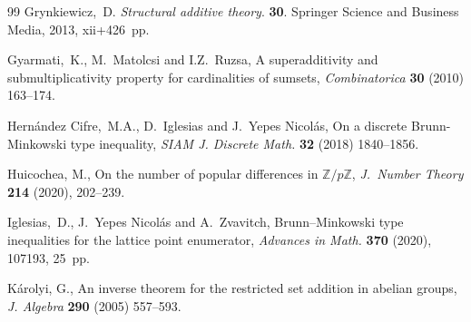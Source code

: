 \documentclass[12pt,reqno]{amsart}
\theoremstyle{definition}
\begin{document}
\begin{thebibliography}{99}
Grynkiewicz,~D. {\em Structural additive theory}. \textbf{30}. Springer Science and Business Media, 2013, xii+426~pp.



Gyarmati,~K., M.~Matolcsi and I.Z.~Ruzsa,  A superadditivity and submultiplicativity property for cardinalities of sumsets, {\em Combinatorica} {\bf 30} (2010) 163--174.





Hernández Cifre,~M.A., D.~Iglesias and J.~Yepes Nicolás,
On a discrete Brunn-Minkowski type inequality,
{\em SIAM J. Discrete Math.} {\bf 32} (2018) 1840--1856.

Huicochea, M., On the number of popular differences in ${\mathbb Z} / p {\mathbb Z}$,
{\em J.~Number Theory} {\bf 214} (2020), 202--239.

Iglesias,~D., J.~Yepes Nicol\'as and A.~Zvavitch,  Brunn--Minkowski type inequalities for the lattice point enumerator, {\em Advances in Math.} {\bf 370} (2020), 107193, 25~pp.

K\'arolyi, G.,
An inverse theorem for the restricted set addition in abelian groups,
{\em J. Algebra} {\bf 290} (2005) 557--593.





\end{thebibliography}
\end{document}

